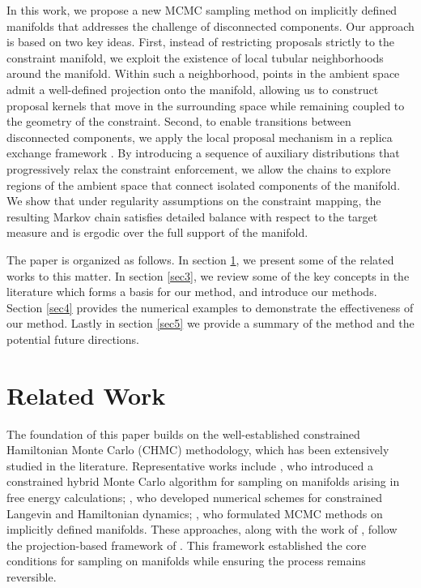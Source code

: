 \documentclass[12pt]{article}
\begin{document}
In this work, we propose a new MCMC sampling method on implicitly defined manifolds that addresses the challenge of disconnected components. Our approach is based on two key ideas. First, instead of restricting proposals strictly to the constraint manifold, we exploit the existence of local tubular neighborhoods around the manifold. Within such a neighborhood, points in the ambient space admit a well-defined projection onto the manifold, allowing us to construct proposal kernels that move in the surrounding space while remaining coupled to the geometry of the constraint. 
Second, to enable transitions between disconnected components, we apply the local proposal mechanism in a replica exchange framework \citep{J15}. By introducing a sequence of auxiliary distributions that progressively relax the constraint enforcement, we allow the chains to explore regions of the ambient space that connect isolated components of the manifold. We show that under regularity assumptions on the constraint mapping, the resulting Markov chain satisfies detailed balance with respect to the target measure and is ergodic over the full support of the manifold. 

The paper is organized as follows. In section \ref{sec2}, we present some of the related works to this matter. In section \ref{sec3}, we review some of the key concepts in the literature which forms a basis for our method, and introduce our methods. Section \ref{sec4} provides the numerical examples to demonstrate the effectiveness of our method. Lastly in section \ref{sec5} we provide a summary of the method and the potential  future directions.


\section{Related Work}\label{sec2}
The foundation of this paper builds on the well-established constrained Hamiltonian Monte Carlo (CHMC) methodology, which has been extensively studied in the literature. Representative works include \citet{J4}, who introduced a constrained hybrid Monte Carlo algorithm for sampling on manifolds arising in free energy calculations; \citet{M2}, who developed numerical schemes for constrained Langevin and Hamiltonian dynamics; \citet{M3}, who formulated MCMC methods on implicitly defined manifolds. These approaches, along with the work of \citet{M4}, follow the projection-based framework of \citet{M5}. This framework established the core conditions for sampling on manifolds while ensuring the process remains reversible.
\end{document}
